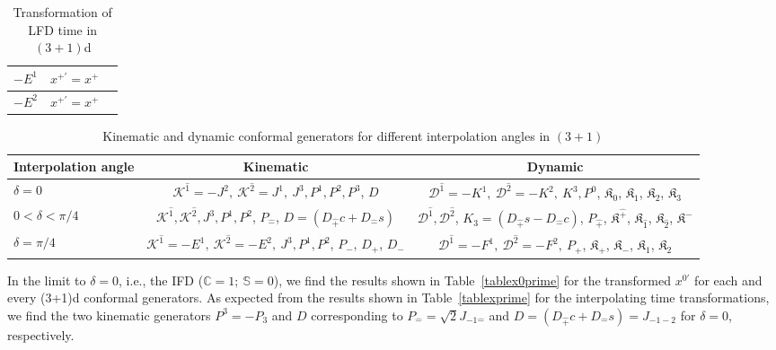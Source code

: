 \documentclass[%
 reprint,
superscriptaddress,
 amsmath,amssymb,
 aps,
]{revtex4-2}
\newcommand{\pT}{\hat{+}}
\newcommand{\mT}{\hat{-}}
\begin{document}
\begin{widetext}
\begin{center}
\begin{table}[!htb]
\begin{minipage}{.5\linewidth}
\begin{tabular}{|c||c|c|}
               \hline
               \rule{0pt}{16pt} $-E^{1}$ & $ x^{{+}\prime}=x^{{+}}$ \\
               \hline
               \rule{0pt}{16pt}$-E^{2}$ & $ x^{{+}\prime}=x^{{+}}$ \\
               \hline
        \end{tabular}
        \caption{Transformation of LFD time in $(3+1)$d}
        \label{tablexplusprime}
          \end{minipage} 
    \end{table}
    \end{center}



\begin{table}[h!]
    \begin{ruledtabular}
       \begin{tabular}{lcc}
	Interpolation angle & Kinematic & Dynamic \\
	\hline
	\rule{0pt}{3ex} $\delta=0$ & $\mathcal{K}^{\hat{1}}=-J^{2},~ \mathcal{K}^{\hat{2}}=J^{1},~ J^{3}, P^{1}, P^{2}, P^{3}$, $D$ & $\mathcal{D}^{\hat{1}}=-K^{1},~ \mathcal{D}^{\hat{2}}=-K^{2},~ K^{3}, P^{0}$, $\mathfrak{K}_{{0}}$, $\mathfrak{K}_{{1}}$, $\mathfrak{K}_{{2}}$, $\mathfrak{K}_{{3}}$\\
	$0<\delta<\pi/4$ &  $\mathcal{K}^{\hat{1}}, \mathcal{K}^{\hat{2}}, J^{3}, P^{1}, P^{2}$, $P_{\mT}$, $D=\left(D_{\hat{+}}c+D_{\hat{-}}s\right)$ &  $\mathcal{D}^{\hat{1}}, \mathcal{D}^{\hat{2}}$, $K_3=\left(D_{\hat{+}}s-D_{\hat{-}}c\right)$,  $P_{\pT}$, $\mathfrak{K}^{\hat{+}}$, $\mathfrak{K}_{\hat{1}}$, $\mathfrak{K}_{\hat{2}}$, $\mathfrak{K}^{\hat{-}}$\\
	$\delta=\pi/4$ & $\mathcal{K}^{\hat{1}}=-E^{1},~ \mathcal{K}^{\hat{2}}=-E^{2},~ J^{3}, P^{1}, P^{2}$, $P_{-}$, $D_{+}$, $D_{-}$& $\mathcal{D}^{\hat{1}}=-F^{1},~ \mathcal{D}^{\hat{2}}=-F^{2},~ P_{+}$, $\mathfrak{K}_{{+}}$, $\mathfrak{K}_{{-}}$, $\mathfrak{K}_{{1}}$, $\mathfrak{K}_{{2}}$\\
      \end{tabular}
    \end{ruledtabular}
    \caption{\label{tab:Kinematic_and_dynamic_generators_for_different_interoplation_angles_conformal1+1}Kinematic and dynamic conformal generators for different interpolation angles in $(3+1)$}
\end{table}
\end{widetext}

%


In the limit to $\delta=0$, i.e., the IFD ($\mathbb{C}=1;~\mathbb{S}=0$), we find the results shown in Table~\ref{tablex0prime} for the transformed $x^{0\prime}$ 
for each and every (3+1)d conformal generators. As expected from the results shown in Table~\ref{tablexprime} for the interpolating time transformations, we find the two kinematic generators $P^3 = - P_3$ and $D$ corresponding 
to $P_{\hat -} = \sqrt{2}J_{-1\hat{-}}$ and $D=\left(D_{\hat{+}}c+D_{\hat{-}}s\right)=J_{-1 -2}$ for $\delta =0$, respectively.
\end{document}
